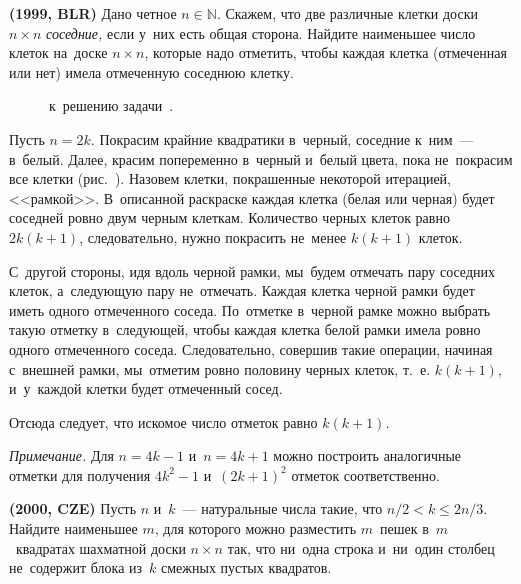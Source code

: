 \begin{problems}

\item\textbf{(1999, BLR)}
Дано четное $n \in \mathbb{N}$.
Скажем, что две различные клетки доски $n \times n$ \emph{соседние,} если у~них
есть общая сторона.
Найдите наименьшее число клеток на~доске $n \times n$, которые надо отметить,
чтобы каждая клетка (отмеченная или нет) имела отмеченную соседнюю клетку.

\end{problems}

\ifincludesolutions
\begin{figure}[ht]\begin{center}
\caption{к~решению
    задачи~.}%
%
\end{center}\end{figure}
Пусть $n = 2 k$.
Покрасим крайние квадратики в~черный, соседние к~ним~--- в~белый.
Далее, красим попеременно в~черный и~белый цвета, пока не~покрасим все клетки 
(рис.~).
Назовем клетки, покрашенные некоторой итерацией, <<рамкой>>.
В~описанной раскраске каждая клетка (белая или черная) будет соседней ровно
двум черным клеткам.
Количество черных клеток равно $2 k (k + 1)$, следовательно, нужно покрасить
не~менее $k (k + 1)$ клеток.
\par
С~другой стороны, идя вдоль черной рамки, мы~будем отмечать пару соседних
клеток, а~следующую пару не~отмечать.
Каждая клетка черной рамки будет иметь одного отмеченного соседа.
По~отметке в~черной рамке можно выбрать такую отметку в~следующей, чтобы каждая
клетка белой рамки имела ровно одного отмеченного соседа.
Следовательно, совершив такие операции, начиная с~внешней рамки, мы~отметим
ровно половину черных клеток, т.~е. $k (k + 1)$, и~у~каждой клетки будет
отмеченный сосед.
\par
Отсюда следует, что искомое число отметок равно $k (k + 1)$.
\par
\emph{Примечание.}
Для $n = 4 k - 1$ и~$n = 4 k + 1$ можно построить аналогичные отметки для
получения $4 k^2 - 1$ и~$(2 k + 1)^2$ отметок соответственно.
\fi %

\begin{problems}

\item\textbf{(2000, CZE)}%
Пусть $n$ и~$k$~--- натуральные числа такие, что $n / 2 < k \leq 2 n / 3$.
Найдите наименьшее $m$, для которого можно разместить $m$~пешек в~$m$~квадратах
шахматной доски $n \times n$ так, что ни~одна строка и~ни~один столбец
не~содержит блока из~$k$ смежных пустых квадратов.

\end{problems}

